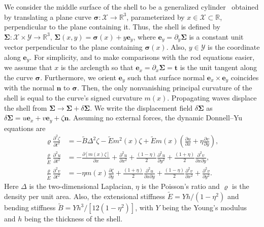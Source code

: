 We consider the middle surface of the shell to be a generalized cylinder~\cite{pressley2010} obtained by translating a plane curve $\bm{\sigma}: \mathcal{X} \to \mathbb{R}^{3}$, parameterized by $x \in \mathcal{X} \subset \mathbb{R}$, perpendicular to the plane containing it.
Thus, the shell is defined by $\bm{\Sigma}: \mathcal{X}\times\mathcal{Y} \to \mathbb{R}^{3}$, $\bm{\Sigma}(x, y) = \bm{\sigma}(x) + y{\bm{e}}_{y}$, where $\bm{e}_{y} = \partial_{y}\bm{\Sigma}$ is a constant unit vector perpendicular to the plane containing $\bm{\sigma}(x)$.
Also, $y \in \mathcal{Y}$ is the coordinate along $\bm{e}_{y}$.
For simplicity, and to make comparisons with the rod equations easier, we assume that $x$ is the arclength so that $\bm{e}_{x} = \partial_{x}\bm{\Sigma} = \bm{t}$ is the unit tangent along the curve $\bm{\sigma}$.
Furthermore, we orient $\bm{e}_{y}$ such that surface normal $\bm{e}_{x}\times\bm{e}_{y}$ coincides with the normal $\bm{n}$ to $\bm{\sigma}$.
Then, the only nonvanishing principal curvature of the shell is equal to the curve's signed curvature $m(x)$.
Propagating waves displace the shell from $\bm{\Sigma} \to \bm{\Sigma} + \delta\bm{\Sigma}$.
We write the displacement field $\delta\bm{\Sigma}$ as $\delta\bm{\Sigma} = u\bm{e}_{x} + v\bm{e}_{y} + \zeta\bm{n}$.
Assuming no external forces, the dynamic Donnell--Yu equations are
%
\begin{subequations}
  \begin{align}
    \varrho \frac{\partial^{2}\zeta}{\partial t^{2}} &= -\widetilde{B}\Delta^{2}\zeta - \widetilde{E}m^{2}(x) \zeta + \widetilde{E}m(x)\left(\frac{\partial u}{\partial x} + \eta\frac{\partial v}{\partial y}\right),\\
    \frac{\varrho}{\widetilde{E}} \frac{\partial^{2}u}{\partial t^{2}} &= -\frac{\partial\left[m(x)\zeta\right]}{\partial x} + \frac{\partial^{2}u}{\partial x^2} + \frac{(1-\eta)}{2}\frac{\partial^{2}u}{\partial y^{2}} + \frac{(1+\eta)}{2}\frac{\partial^{2}v}{\partial x \partial y},\\
    \frac{\varrho}{\widetilde{E}} \frac{\partial^{2}v}{\partial t^{2}}&= -\eta m(x)\frac{\partial \zeta}{\partial y} + \frac{(1+\eta)}{2}\frac{\partial^{2}u}{\partial x \partial y} + \frac{(1-\eta)}{2}\frac{\partial^{2}v}{\partial x^{2}} + \frac{\partial^{2}v}{\partial y^2}.
  \end{align}
\end{subequations}
%
Here $\Delta$ is the two-dimensional Laplacian, $\eta$ is the Poisson's ratio and $\varrho$ is the density per unit area.
Also, the extensional stiffness $\widetilde{E} = Yh/(1-\eta^{2})$ and bending stiffness $\widetilde{B} = Yh^{3}/\left[12(1-\eta^{2})\right]$, with $Y$ being the Young's modulus and $h$ being the thickness of the shell.
